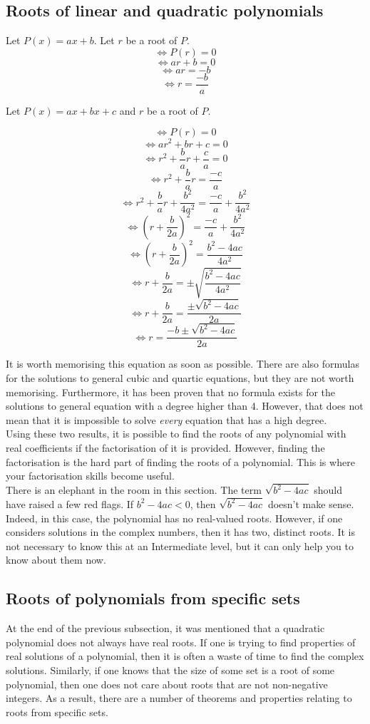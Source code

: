 \documentclass[a4paper,12pt]{article}
\begin{document}
\subsection{Roots of linear and quadratic polynomials}
Let $P(x) = ax + b$. Let $r$ be a root of $P$.
$$\iff P(r) = 0$$
$$\iff ar + b = 0$$
$$\iff ar = -b$$
$$\iff r = \frac{-b}{a}$$

Let $P(x) = ax + bx + c$ and $r$ be a root of $P$.
 
$$\iff P(r) = 0$$
$$\iff ar^2 + br + c = 0$$
$$\iff r^2 + \frac{b}{a}r + \frac{c}{a} = 0$$
$$\iff r^2 + \frac{b}{a}r = \frac{-c}{a}$$
$$\iff r^2 + \frac{b}{a}r + \frac{b^2}{4a^2} = \frac{-c}{a} + \frac{b^2}{4a^2}$$
$$\iff (r + \frac{b}{2a})^2 = \frac{-c}{a} + \frac{b^2}{4a^2}$$
$$\iff (r + \frac{b}{2a})^2 = \frac{b^2 - 4ac}{4a^2}$$
$$\iff r + \frac{b}{2a} = \pm\sqrt{ \frac{b^2 - 4ac}{4a^2} }$$
$$\iff r + \frac{b}{2a} = \frac{\pm \sqrt{b^2 - 4ac}}{2a}$$
$$\iff r = \frac{-b \pm \sqrt{b^2 - 4ac}}{2a}$$

It is worth memorising this equation as soon as possible. There are also formulas for the solutions to general cubic and quartic equations, but they are not worth memorising. Furthermore, it has been proven that no formula exists for the solutions to general equation with a degree higher than 4. However, that does not mean that it is impossible to solve \emph{every} equation that has a high degree. \\

Using these two results, it is possible to find the roots of any polynomial with real coefficients if the factorisation of it is provided. However, finding the factorisation is the hard part of finding the roots of a polynomial. This is where your factorisation skills become useful. \\

There is an elephant in the room in this section. The term $\sqrt{b^2 - 4ac}$ should have raised a few red flags. If $b^2 - 4ac < 0$, then $\sqrt{b^2 - 4ac}$ doesn't make sense. Indeed, in this case, the polynomial has no real-valued roots. However, if one considers solutions in the complex numbers, then it has two, distinct roots. It is not necessary to know this at an Intermediate level, but it can only help you to know about them now.

\subsection{Roots of polynomials from specific sets}
At the end of the previous subsection, it was mentioned that a quadratic polynomial does not always have real roots. If one is trying to find properties of real solutions of a polynomial, then it is often a waste of time to find the complex solutions. Similarly, if one knows that the size of some set is a root of some polynomial, then one does not care about roots that are not non-negative integers. As a result, there are a number of theorems and properties relating to roots from specific sets. \\
\end{document}

